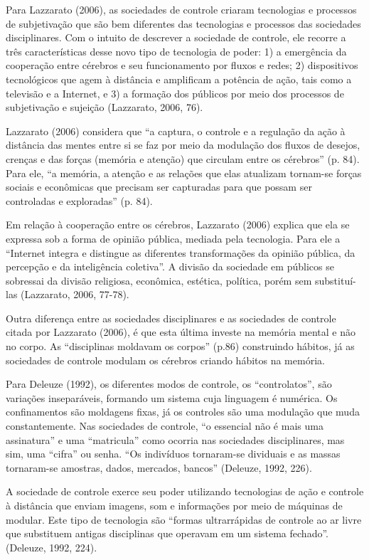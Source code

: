 Para Lazzarato (2006), as sociedades de controle criaram tecnologias e
processos de subjetivação que são bem diferentes das tecnologias e
processos das sociedades disciplinares. Com o intuito de descrever a
sociedade de controle, ele recorre a três características desse novo
tipo de tecnologia de poder: 1) a emergência da cooperação entre
cérebros e seu funcionamento por fluxos e redes; 2) dispositivos
tecnológicos que agem à distância e amplificam a potência de ação, tais
como a televisão e a Internet, e 3) a formação dos públicos por meio dos
processos de subjetivação e sujeição (Lazzarato, 2006, 76).

Lazzarato (2006) considera que ``a captura, o controle e a regulação da
ação à distância das mentes entre si se faz por meio da modulação dos
fluxos de desejos, crenças e das forças (memória e atenção) que circulam
entre os cérebros'' (p. 84). Para ele, ``a memória, a atenção e as
relações que elas atualizam tornam-se forças sociais e econômicas que
precisam ser capturadas para que possam ser controladas e exploradas''
(p. 84).

Em relação à cooperação entre os cérebros, Lazzarato (2006) explica que
ela se expressa sob a forma de opinião pública, mediada pela tecnologia.
Para ele a ``Internet integra e distingue as diferentes transformações
da opinião pública, da percepção e da inteligência coletiva''. A divisão
da sociedade em públicos se sobressai da divisão religiosa, econômica,
estética, política, porém sem substituí-las (Lazzarato, 2006, 77-78).

Outra diferença entre as sociedades disciplinares e as sociedades de
controle citada por Lazzarato (2006), é que esta última investe na
memória mental e não no corpo. As ``disciplinas moldavam os corpos''
(p.86) construindo hábitos, já as sociedades de controle modulam os
cérebros criando hábitos na memória.

Para Deleuze (1992), os diferentes modos de controle, os
``controlatos'', são variações inseparáveis, formando um sistema cuja
linguagem é numérica. Os confinamentos são moldagens fixas, já os
controles são uma modulação que muda constantemente. Nas sociedades de
controle, ``o essencial não é mais uma assinatura'' e uma ``matricula''
como ocorria nas sociedades disciplinares, mas sim, uma ``cifra'' ou
senha. ``Os indivíduos tornaram-se dividuais e as massas tornaram-se
amostras, dados, mercados, bancos'' (Deleuze, 1992, 226).

A sociedade de controle exerce seu poder utilizando tecnologias de ação
e controle à distância que enviam imagens, som e informações por meio de
máquinas de modular. Este tipo de tecnologia são ``formas ultrarrápidas
de controle ao ar livre que substituem antigas disciplinas que operavam
em um sistema fechado''. (Deleuze, 1992, 224).

